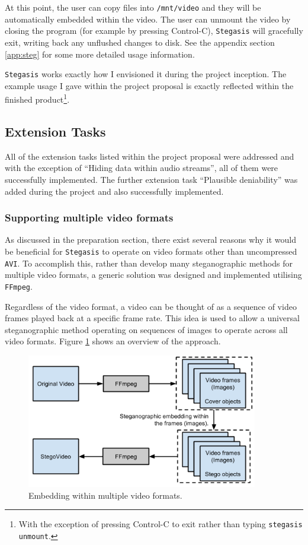 \documentclass[paper=a4, fontsize=11pt,twoside]{scrartcl}
\numberwithin{table}{section}
\numberwithin{figure}{section}
\numberwithin{algorithm}{section}
\begin{document}
At this point, the user can copy files into \texttt{/mnt/video} and they will be automatically embedded within the video. The user can unmount the video by closing the program (for example by pressing Control-C), \texttt{Stegasis} will gracefully exit, writing back any unflushed changes to disk. See the appendix section \ref{app:steg} for some more detailed usage information.

\texttt{Stegasis} works exactly how I envisioned it during the project inception. The example usage I gave within the project proposal is exactly reflected within the finished product\footnote{With the exception of pressing Control-C to exit rather than typing \texttt{stegasis unmount}.}.

\subsection{Extension Tasks}

All of the extension tasks listed within the project proposal were addressed and with the exception of ``Hiding data within audio streams'', all of them were successfully implemented. The further extension task ``Plausible deniability'' was added during the project and also successfully implemented.

\subsubsection{Supporting multiple video formats}
\label{extffmpeg}

As discussed in the preparation section, there exist several reasons why it would be beneficial for \texttt{Stegasis} to operate on video formats other than uncompressed \texttt{AVI}. To accomplish this, rather than develop many steganographic methods for multiple video formats, a generic solution was designed and implemented utilising \texttt{FFmpeg}.

Regardless of the video format, a video can be thought of as a sequence of video frames played back at a specific frame rate. This idea is used to allow a universal steganographic method operating on sequences of images to operate across all video formats. Figure \ref{multi} shows an overview of the approach.

\begin{figure}[!htb]
\centerline{\includegraphics[width=0.9\textwidth]{images/multi.png}}
\caption{Embedding within multiple video formats.}
\label{multi}
\end{figure}
\end{document}
